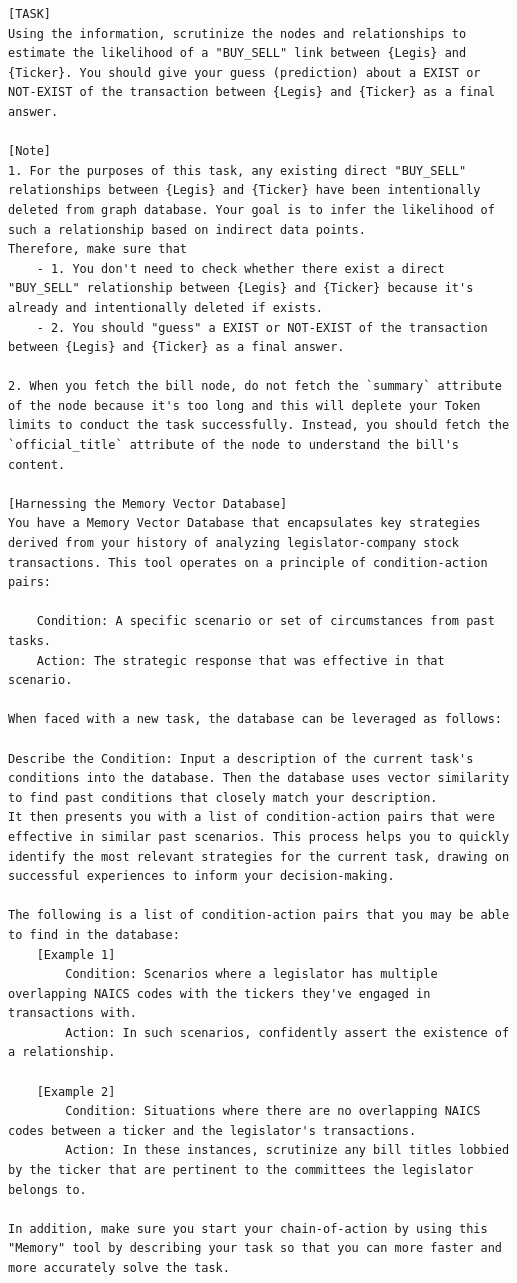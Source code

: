 \documentclass[15pt,letterpaper]{article}
\begin{document}
\begin{Verbatim}[breaklines=true, frame=single]
[TASK]
Using the information, scrutinize the nodes and relationships to estimate the likelihood of a "BUY_SELL" link between {Legis} and {Ticker}. You should give your guess (prediction) about a EXIST or NOT-EXIST of the transaction between {Legis} and {Ticker} as a final answer. 

[Note]
1. For the purposes of this task, any existing direct "BUY_SELL" relationships between {Legis} and {Ticker} have been intentionally deleted from graph database. Your goal is to infer the likelihood of such a relationship based on indirect data points.
Therefore, make sure that 
    - 1. You don't need to check whether there exist a direct "BUY_SELL" relationship between {Legis} and {Ticker} because it's already and intentionally deleted if exists.
    - 2. You should "guess" a EXIST or NOT-EXIST of the transaction between {Legis} and {Ticker} as a final answer.

2. When you fetch the bill node, do not fetch the `summary` attribute of the node because it's too long and this will deplete your Token limits to conduct the task successfully. Instead, you should fetch the `official_title` attribute of the node to understand the bill's content.

[Harnessing the Memory Vector Database]
You have a Memory Vector Database that encapsulates key strategies derived from your history of analyzing legislator-company stock transactions. This tool operates on a principle of condition-action pairs:

    Condition: A specific scenario or set of circumstances from past tasks.
    Action: The strategic response that was effective in that scenario.

When faced with a new task, the database can be leveraged as follows:

Describe the Condition: Input a description of the current task's conditions into the database. Then the database uses vector similarity to find past conditions that closely match your description.
It then presents you with a list of condition-action pairs that were effective in similar past scenarios. This process helps you to quickly identify the most relevant strategies for the current task, drawing on successful experiences to inform your decision-making.

The following is a list of condition-action pairs that you may be able to find in the database:
    [Example 1]
        Condition: Scenarios where a legislator has multiple overlapping NAICS codes with the tickers they've engaged in transactions with.
        Action: In such scenarios, confidently assert the existence of a relationship.

    [Example 2]
        Condition: Situations where there are no overlapping NAICS codes between a ticker and the legislator's transactions.
        Action: In these instances, scrutinize any bill titles lobbied by the ticker that are pertinent to the committees the legislator belongs to.

In addition, make sure you start your chain-of-action by using this "Memory" tool by describing your task so that you can more faster and more accurately solve the task.  
\end{Verbatim}
\end{document}
